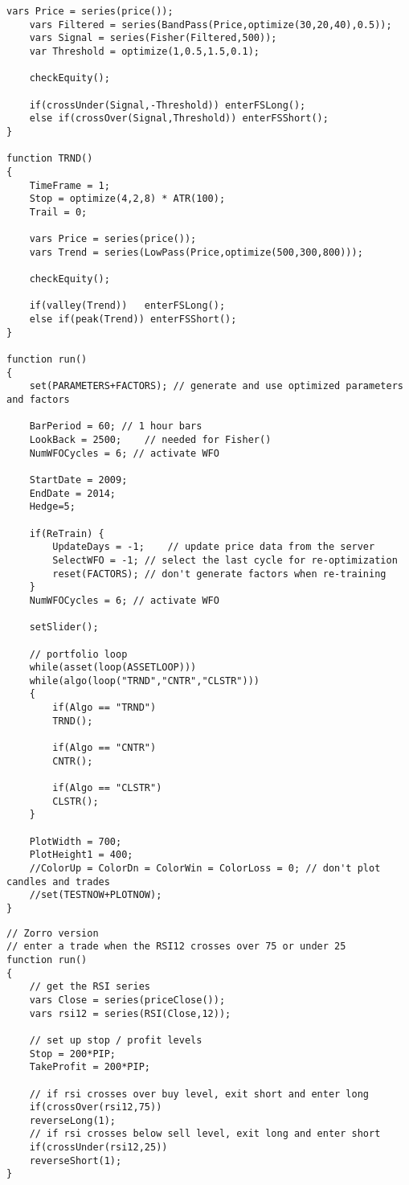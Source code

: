 \begin{lstlisting}[caption=System]
	vars Price = series(price());
	vars Filtered = series(BandPass(Price,optimize(30,20,40),0.5));
	vars Signal = series(Fisher(Filtered,500));
	var Threshold = optimize(1,0.5,1.5,0.1);
	
	checkEquity();
	
	if(crossUnder(Signal,-Threshold)) enterFSLong();
	else if(crossOver(Signal,Threshold)) enterFSShort();	
}

function TRND()
{
	TimeFrame = 1;
	Stop = optimize(4,2,8) * ATR(100);
	Trail = 0;	
	
	vars Price = series(price());
	vars Trend = series(LowPass(Price,optimize(500,300,800)));
	
	checkEquity();
	
	if(valley(Trend))	enterFSLong();
	else if(peak(Trend)) enterFSShort();	
}

function run()
{
	set(PARAMETERS+FACTORS); // generate and use optimized parameters and factors
	
	BarPeriod = 60;	// 1 hour bars
	LookBack = 2500;	// needed for Fisher()
	NumWFOCycles = 6; // activate WFO
	
	StartDate = 2009;
	EndDate = 2014;
	Hedge=5;
	
	if(ReTrain) {
		UpdateDays = -1;	// update price data from the server 
		SelectWFO = -1;	// select the last cycle for re-optimization
		reset(FACTORS);	// don't generate factors when re-training
	}
	NumWFOCycles = 6; // activate WFO
	
	setSlider();
	
	// portfolio loop
	while(asset(loop(ASSETLOOP)))
	while(algo(loop("TRND","CNTR","CLSTR")))
	{	
		if(Algo == "TRND") 
		TRND();
		
		if(Algo == "CNTR") 
		CNTR();
		
		if(Algo == "CLSTR") 
		CLSTR();
	}
	
	PlotWidth = 700;
	PlotHeight1 = 400;
	//ColorUp = ColorDn = ColorWin = ColorLoss = 0; // don't plot candles and trades
	//set(TESTNOW+PLOTNOW);
}

\end{lstlisting}

\begin{lstlisting}[caption=Enter a trade when the RSI12 crosses]
// Zorro version
// enter a trade when the RSI12 crosses over 75 or under 25
function run()
{
	// get the RSI series
	vars Close = series(priceClose());
	vars rsi12 = series(RSI(Close,12));
	
	// set up stop / profit levels
	Stop = 200*PIP;
	TakeProfit = 200*PIP;
	
	// if rsi crosses over buy level, exit short and enter long
	if(crossOver(rsi12,75))
	reverseLong(1);
	// if rsi crosses below sell level, exit long and enter short
	if(crossUnder(rsi12,25))
	reverseShort(1);
}
\end{lstlisting}

